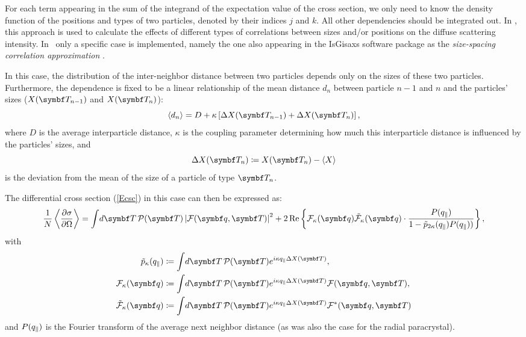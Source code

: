 For each term appearing in the sum of the integrand of the expectation value of the cross section, we
only need to know the density function of the positions and types of two particles, denoted by their
indices $j$ and $k$. All other dependencies should be integrated out. In \cite{LeLa04}, this approach is
used to calculate the effects of different types of correlations between sizes and/or positions on
the diffuse scattering intensity. In \BornAgain\ only a specific case is implemented, namely
the one also appearing in the IsGisaxs software package as the \emph{size-spacing correlation
approximation} \cite{Laz08}.

In this case, the distribution of the inter-neighbor distance between two particles depends only on the
sizes of these two particles. Furthermore, the dependence is fixed to be a linear relationship of
the mean distance $d_n$ between particle $n-1$ and $n$ and the particles' sizes ($X(\v{T}_{n-1})$ and
$X(\v{T}_n)$):
\begin{equation}\label{Edm}
  \langle d_n \rangle
  =
  D + \kappa \left[ \Delta X(\v{T}_{n-1}) + \Delta X(\v{T}_{n}) \right],
\end{equation}
where $D$ is the average interparticle distance, $\kappa$ is the coupling parameter determining how
much this interparticle distance is influenced by the particles' sizes, and
\[ \Delta X(\v{T}_{n}) \coloneqq  X(\v{T}_{n}) - \langle X \rangle \]
is the deviation from the mean of the size of a particle of type $\v{T}_n$.

The differential cross section (\ref{Ecsc}) in this case can then be expressed as:
\begin{equation}\label{Ecsssca}
  \frac{1}{N}\left\langle\frac{\partial\sigma}{\partial\Omega}\right\rangle
  =
  \int\!d\v{T}\,\PD (\v{T}) \left| \FD(\q,\v{T}) \right|^2
  +
  2\Re \left\lbrace \FD_\kappa(\q)\tilde{\FD}_\kappa(\q)
  \cdot
  \frac{P(q_\plll)}{1 - \tilde{p}_{2\kappa}(q_{\plll})P(q_\plll))} \right\rbrace ,
\end{equation}
with
\begin{align*}
  \tilde{p}_{\kappa}(q_\plll) & \coloneqq \int\!d\v{T}\,\PD (\v{T}) e^{i\kappa q_\plll\Delta X(\v{T})}, \\
  \FD_\kappa(\q) & \coloneqq \int\!d\v{T}\,\PD (\v{T}) e^{i\kappa q_\plll\Delta X(\v{T})} \FD(\q, \v{T}), \\
  \tilde{\FD}_\kappa(\q) & \coloneqq \int\!d\v{T}\,\PD (\v{T}) e^{i\kappa q_\plll\Delta X(\v{T})} \FD^*(\q, \v{T})
\end{align*}
and $P(q_\parallel)$ is the Fourier transform of the average next neighbor distance (as was also the case for the radial
paracrystal).
